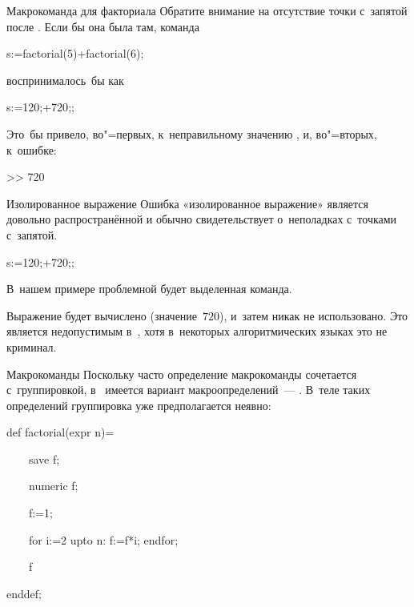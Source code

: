 \begin{frame}{Макрокоманда для факториала}
Обратите внимание на отсутствие точки с~запятой после . Если
бы она была там, команда
\begin{programlisting}
s:=factorial(5)+factorial(6);
\end{programlisting}
воспринималось~бы как
\begin{programlisting}
s:=120\alert{;}+720\alert{;};
\end{programlisting}
Это~бы привело, во"=первых, к~неправильному значению , и,
во"=вторых, к~ошибке:
\begin{screen}
>> 720\par
{}%
%
\end{screen}
\end{frame}

\begin{frame}{Изолированное выражение}
Ошибка «изолированное выражение» является довольно распространённой и обычно
свидетельствует о~неполадках с~точками с~запятой.
\begin{programlisting}
s:=120;\alert{+720\alert;};
\end{programlisting}
В~нашем примере проблемной будет выделенная команда.

Выражение  будет вычислено (значение~$720$), и~затем никак не
использовано. Это является недопустимым в~, хотя в~некоторых
алгоритмических языках это не криминал.
\end{frame}

\begin{frame}{Макрокоманды }
Поскольку часто определение макрокоманды сочетается с~группировкой,
в~ имеется вариант макроопределений~— . В~теле
таких определений группировка уже предполагается неявно:
\begin{programlisting}
\alert{def} factorial(expr n)=\par
{}%
\only<1-2>{~~~~}~~~~save f;\par
{}~~~~numeric f;\par
{}~~~~f:=1;\par
{}~~~~for i:=2 upto n: f:=f*i; endfor;\par
{}~~~~f\par
{}%
enddef;
\end{programlisting}
\end{frame}

